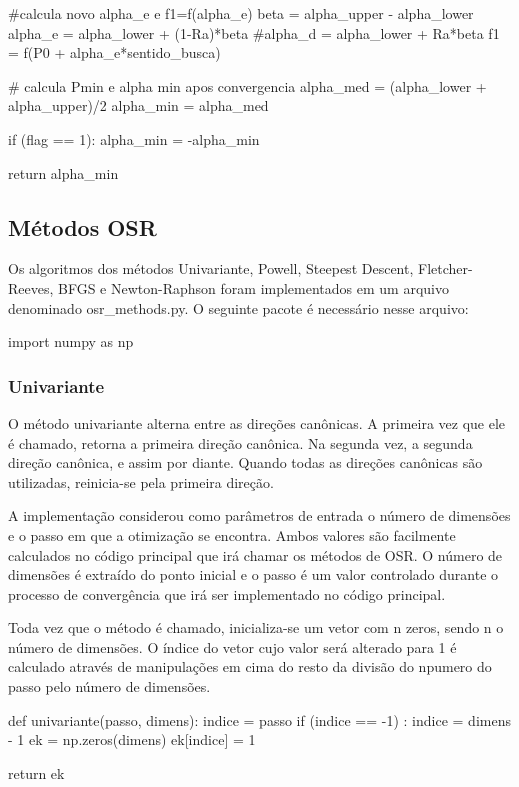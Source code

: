 \documentclass[10pt, a4paper]{article}
\begin{document}
\begin{python}
            #calcula novo alpha_e e f1=f(alpha_e)
            beta = alpha_upper - alpha_lower
            alpha_e = alpha_lower + (1-Ra)*beta
            #alpha_d = alpha_lower + Ra*beta 
            f1 = f(P0 + alpha_e*sentido_busca)
            
    # calcula Pmin e alpha min apos convergencia
    alpha_med = (alpha_lower + alpha_upper)/2
    alpha_min = alpha_med
    
    if (flag == 1):
        alpha_min = -alpha_min
    
    return alpha_min
\end{python}

\subsection{Métodos OSR}

Os algoritmos dos métodos Univariante, Powell, Steepest Descent, Fletcher-Reeves, BFGS e Newton-Raphson foram implementados em um arquivo denominado osr\_methods.py. O seguinte pacote é necessário nesse arquivo: 
\begin{python}
  import numpy as np
\end{python}

\subsubsection{Univariante}

O método univariante alterna entre as direções canônicas. A primeira vez que ele é chamado, retorna a primeira direção canônica. Na segunda vez, a segunda direção canônica, e assim por diante.
Quando todas as direções canônicas são utilizadas, reinicia-se pela primeira direção.

A implementação considerou como parâmetros de entrada o número de dimensões  e o passo em que a otimização se encontra. Ambos valores são facilmente calculados no código principal que irá chamar 
os métodos de OSR. O número de dimensões é extraído do ponto inicial e o passo é um valor controlado durante o processo de convergência que irá ser implementado no código principal.

Toda vez que o método é chamado, inicializa-se um vetor com n zeros, sendo n o número de dimensões. O índice do vetor cujo valor será alterado para 1 é calculado 
através de manipulações em cima do resto da divisão do npumero do passo pelo número de dimensões.

\begin{python}
  def univariante(passo, dimens):
    indice = passo%
    if (indice == -1) :
        indice = dimens - 1
    ek = np.zeros(dimens)
    ek[indice] = 1
    
    return ek
\end{python}
\end{document}
